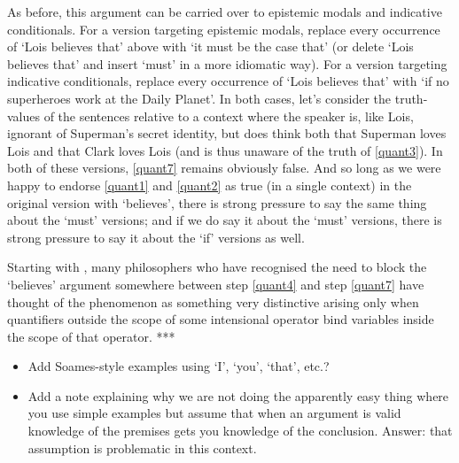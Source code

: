 \documentclass[If.tex]{subfiles}
\begin{document}
As before, this argument can be carried over to epistemic modals and indicative conditionals.  For a version targeting epistemic modals, replace every occurrence of ‘Lois believes that’ above with ‘it must be the case that’ (or delete ‘Lois believes that’ and insert ‘must’ in a more idiomatic way).  For a version targeting indicative conditionals, replace every occurrence of ‘Lois believes that’ with ‘if no superheroes work at the Daily Planet’.  In both cases, let's consider the truth-values of the sentences relative to a context where the speaker is, like Lois, ignorant of Superman's secret identity, but does think both that Superman loves Lois and that Clark loves Lois (and is thus unaware of the truth of \ref{quant3}).  In both of these versions, \ref{quant7} remains obviously false.  And so long as we were happy to endorse \ref{quant1} and \ref{quant2} as true (in a single context) in the original version with ‘believes’, there is strong pressure to say the same thing about the ‘must’ versions; and if we do say it about the ‘must’ versions, there is strong pressure to say it about the ‘if’ versions as well.  

Starting with \citet{KaplanQI}, many philosophers who have recognised the need to block the ‘believes’ argument somewhere between step \ref{quant4} and step \ref{quant7} have thought of the phenomenon as something very distinctive arising only when quantifiers outside the scope of some intensional operator bind variables inside the scope of that operator.  *** 

\begin{itemize}
	\item
	Add Soames-style examples using ‘I’, ‘you’, ‘that’, etc.?  
	\item
	Add a note explaining why we are not doing the apparently easy thing where you use simple examples but assume that when an argument is valid knowledge of the premises gets you knowledge of the conclusion.  Answer: that assumption is problematic in this context. 
\end{itemize}


	
	
\end{document}
